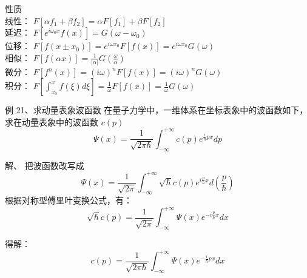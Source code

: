 \begin{frame}
	\frametitle{}
	{\large   性质  }\\ 	\vspace{0.3cm}
    线性： $F[\alpha  f_1 +\beta f_2]=\alpha  F[f_1]+ \beta F[f_2]$ \\ \vspace{0.3cm}
    延迟： $F[e^{i\omega_0x} f(x)] = G(\omega-\omega_0) $ \\ \vspace{0.3cm}
    位移： $F[ f(x\pm x_0)] = e^{i\omega x_0 } F[f(x)]=e^{i\omega x_0 }G(\omega) $ \\ \vspace{0.3cm}
    相似： $F[ f(\alpha  x)] = \frac{1}{|\alpha |}G(\frac{\omega}{\alpha }) $ \\ \vspace{0.3cm}
    微分： $F[ f^{n} (x)] = (i\omega ) ^n F[f(x)]= (i\omega )^n G(\omega) $ \\ \vspace{0.3cm}
    积分： $F[ \int_{x_0}^{x}f (\xi) d\xi ] = \frac{1}{\omega}  F[f(x)]=\frac{1}{\omega} G(\omega) $ \\ \vspace{0.3cm}
\end{frame}

\begin{frame}
	\begin{exampleblock} {例 21、求动量表象波函数}
	{在量子力学中，一维体系在坐标表象中的波函数如下，求在动量表象中的波函数 $c(p)$}
		\begin{equation*}
			\Psi(x)=\frac{1}{\sqrt{2\pi \hbar}}  \int_{-\infty}^{+\infty} c(p) e^{\frac{i}{\hbar} px} dp 
		\end{equation*}   	
	\end{exampleblock}
	\alert{解、} 	把波函数改写成  \\	
	\begin{equation*}
		\Psi(x)= \frac{1}{\sqrt{2\pi }} \int_{-\infty}^{+\infty} \sqrt{\hbar} c(p) e^{i\frac{p}{\hbar} x} d(\frac{p}{\hbar})  
	\end{equation*}     
	根据对称型傅里叶变换公式，有： 
	\begin{equation*}
		\sqrt{\hbar} c(p) = \frac{1}{\sqrt{2\pi }} \int_{-\infty}^{+\infty} \Psi(x) e^{-i\frac{p}{\hbar} x} dx
	\end{equation*}   
\end{frame}

\begin{frame}
	得解：
	\begin{equation*}
		c(p) = \frac{1}{\sqrt{2\pi \hbar }} \int_{-\infty}^{+\infty} \Psi(x) e^{-\frac{i}{\hbar} px} dx
	\end{equation*}   
\end{frame}

